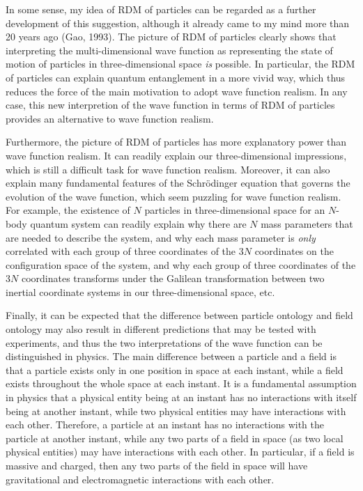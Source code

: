 In some sense, my idea of RDM of particles can be regarded as a further development of this suggestion, although it already came to my mind more than 20 years ago (Gao, 1993).
The picture of RDM of particles clearly shows that interpreting the multi-dimensional wave function as representing the state of motion of particles in three-dimensional space \emph{is} possible. 
In particular, the RDM of particles can explain quantum entanglement in a more vivid way, which thus reduces the force of the main motivation to adopt wave function realism.
In any case, this new interpretion of the wave function in terms of RDM of particles provides an alternative to wave function realism. 

Furthermore, the picture of RDM of particles has more explanatory power than wave function realism.
It can readily explain our three-dimensional impressions, which is still a difficult task for wave function realism.
Moreover, it can also explain many fundamental features of the Schr\"{o}dinger equation that governs the evolution of the wave function, which seem puzzling for wave function realism.
For example, the existence of $N$ particles in three-dimensional space for an $N$-body quantum system can readily explain why there are $N$ mass parameters that are needed to describe the system, and why each mass parameter is \emph{only} correlated with each group of three coordinates of the $3N$ coordinates on the configuration space of the system, and why each group of three coordinates of the $3N$ coordinates transforms under the Galilean transformation between two inertial coordinate systems in our three-dimensional space, etc.

Finally, it can be expected that the difference between particle ontology and field ontology may also result in different predictions that may be tested with experiments, and thus the two interpretations of the wave function can be distinguished in physics.
The main difference  between a particle  and a field  is that a particle exists only in one position in space at each instant, while a field exists throughout the whole space at each instant.
It is a fundamental assumption in physics that a physical entity being at an instant has no interactions with itself being at another instant, while two physical entities may have interactions with each other. 
Therefore, a particle at an instant has no interactions with the particle at another instant, while any two parts of a field in space (as two local physical entities) may have interactions with each other. 
In particular, if a field is massive and charged, then any two parts of the field in space will have gravitational and electromagnetic interactions with each other.

